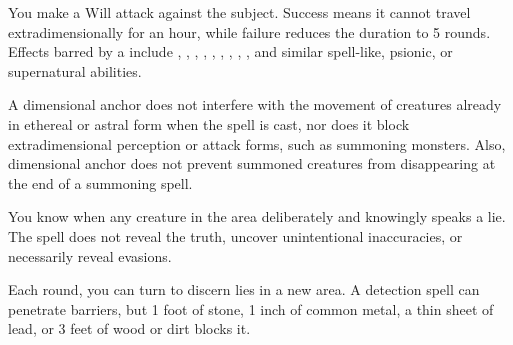 \spellrng{\rngmed}
\begin{spelleffect}
    You make a Will attack against the subject. Success means it cannot travel extradimensionally for an hour, while failure reduces the duration to 5 rounds. Effects barred by a  include , , , , , , , , , and similar spell-like, psionic, or supernatural abilities.
\end{spelleffect}
\begin{spellnotes}
  A dimensional anchor does not interfere with the movement of creatures already in ethereal or astral form when the spell is cast, nor does it block extradimensional perception or attack forms, such as summoning monsters. Also, dimensional anchor does not prevent summoned creatures from disappearing at the end of a summoning spell. 
\end{spellnotes}

\begin{spelleffect}
  You know when any creature in the area deliberately and knowingly speaks a lie. The spell does not reveal the truth, uncover unintentional inaccuracies, or necessarily reveal evasions.
\end{spelleffect}
\begin{spellnotes}
  Each round, you can turn to discern lies in a new area. A detection spell can penetrate barriers, but 1 foot of stone, 1 inch of common metal, a thin sheet of lead, or 3 feet of wood or dirt blocks it.
\end{spellnotes}

